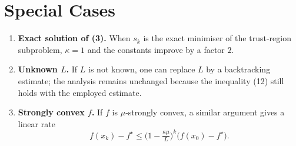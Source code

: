 \documentclass{article}
\begin{document}
\section*{Special Cases}
\begin{enumerate}
\item \textbf{Exact solution of (3).}  
When $s_k$ is the exact minimiser of the trust‑region subproblem, $\kappa=1$ and the constants improve by a factor $2$.
\item \textbf{Unknown $L$.}  
If $L$ is not known, one can replace $L$ by a backtracking estimate; the analysis remains unchanged because the inequality (12) still holds with the employed estimate.
\item \textbf{Strongly convex $f$.}  
If $f$ is $\mu$‑strongly convex, a similar argument gives a linear rate
\[
f(x_k)-f^\star\le \bigl(1-\tfrac{\kappa\mu}{L}\bigr)^k\bigl(f(x_0)-f^\star\bigr).
\]
\end{enumerate}
\end{document}

